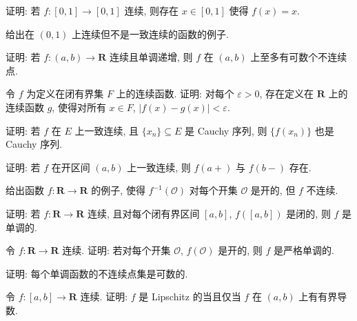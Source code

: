 \documentclass[../../main.tex]{subfiles}
\begin{document}
\begin{exercise}\label{exercise:ch01-50}
证明: 若 $f:[0,1]\to[0,1]$ 连续, 则存在 $x\in[0,1]$ 使得 $f(x)=x$.
\end{exercise}

\begin{exercise}\label{exercise:ch01-51}
给出在 $(0,1)$ 上连续但不是一致连续的函数的例子.
\end{exercise}

\begin{exercise}\label{exercise:ch01-52}
证明: 若 $f:(a,b)\to\mathbf{R}$ 连续且单调递增, 则 $f$ 在 $(a,b)$ 上至多有可数个不连续点.
\end{exercise}

\begin{exercise}\label{exercise:ch01-53}
令 $f$ 为定义在闭有界集 $F$ 上的连续函数. 证明: 对每个 $\varepsilon>0$, 存在定义在 $\mathbf{R}$ 上的连续函数 $g$, 使得对所有 $x\in F$, $|f(x)-g(x)|<\varepsilon$.
\end{exercise}

\begin{exercise}\label{exercise:ch01-54}
证明: 若 $f$ 在 $E$ 上一致连续, 且 $\{x_{n}\}\subseteq E$ 是 Cauchy 序列, 则 $\{f(x_{n})\}$ 也是 Cauchy 序列.
\end{exercise}

\begin{exercise}\label{exercise:ch01-55}
证明: 若 $f$ 在开区间 $(a,b)$ 上一致连续, 则 $f(a+)$ 与 $f(b-)$ 存在.
\end{exercise}

\begin{exercise}\label{exercise:ch01-56}
给出函数 $f:\mathbf{R}\to\mathbf{R}$ 的例子, 使得 $f^{-1}(\mathcal{O})$ 对每个开集 $\mathcal{O}$ 是开的, 但 $f$ 不连续.
\end{exercise}

\begin{exercise}\label{exercise:ch01-57}
证明: 若 $f:\mathbf{R}\to\mathbf{R}$ 连续, 且对每个闭有界区间 $[a,b]$, $f([a,b])$ 是闭的, 则 $f$ 是单调的.
\end{exercise}

\begin{exercise}\label{exercise:ch01-58}
令 $f:\mathbf{R}\to\mathbf{R}$ 连续. 证明: 若对每个开集 $\mathcal{O}$, $f(\mathcal{O})$ 是开的, 则 $f$ 是严格单调的.
\end{exercise}

\begin{exercise}\label{exercise:ch01-59}
证明: 每个单调函数的不连续点集是可数的.
\end{exercise}

\begin{exercise}\label{exercise:ch01-60}
令 $f:[a,b]\to\mathbf{R}$ 连续. 证明: $f$ 是 Lipschitz 的当且仅当 $f$ 在 $(a,b)$ 上有有界导数.
\end{exercise}
\end{document}
